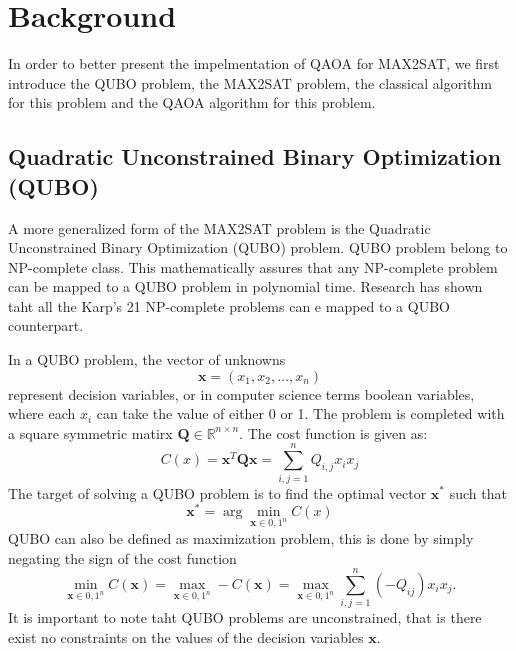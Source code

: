 \documentclass[%
 reprint,
 amsmath,amssymb,
 aps,
]{revtex4-2}
\begin{document}
\section{\label{sec:Background}Background}
In order to better present the impelmentation of QAOA for MAX2SAT, we first introduce the QUBO problem, the MAX2SAT problem, the classical algorithm for this problem and the QAOA algorithm for this problem.
\subsection{\label{subsec:QUBO}Quadratic Unconstrained Binary Optimization (QUBO)}
A more generalized form of the MAX2SAT problem is the Quadratic Unconstrained Binary Optimization (QUBO) problem. QUBO problem belong to NP-complete class. This mathematically assures that any NP-complete problem can be mapped to a QUBO problem in polynomial time. Research has shown taht all the Karp's 21 NP-complete problems can e mapped to a QUBO counterpart\cite{Lucas_2014}. 

In a QUBO problem, the vector of unknowns $$\mathbf{x} = (x_1, x_2, \ldots, x_n)$$ represent decision variables, or in computer science terms boolean variables, where each $x_i$ can take the value of either 0 or 1. The problem is completed with a square symmetric matirx $\mathbf{Q}\in \mathbb{R}^{n\times n}$. The cost function is given as: 
$$C(x) = \mathbf{x}^T \mathbf{Q} \mathbf{x} = \sum_{i,j=1}^{n}Q_{i,j}x_i x_j$$
The target of solving a QUBO problem is to find the optimal vector $\mathbf{x}^{*}$ such that 
$$\mathbf{x}^{*} = \arg\min_{\mathbf{x}\in{0,1}^n} C(x)$$
QUBO can also be defined as maximization problem, this is done by simply negating the sign of the cost function
$$\min_{\mathbf{x} \in {0,1}^{n}} C(\mathbf{x}) = \max_{\mathbf{x}\in{0, 1}^n} -C(\mathbf{x}) = \max_{\mathbf{x} \in {0, 1}^n} \sum_{i,j=1}^{n} (-Q_{ij})x_i x_j .$$
It is important to note taht QUBO problems are unconstrained, that is there exist no constraints on the values of the decision variables $\mathbf{x}$.
\end{document}
